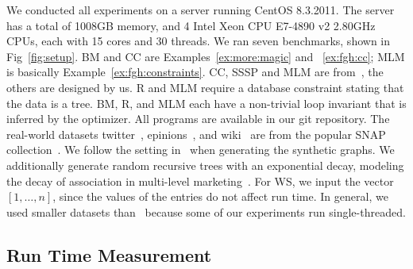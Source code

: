     We conducted all experiments on a server running CentOS 8.3.2011.
    The server has a total of 1008GB memory, and
    4 Intel Xeon CPU E7-4890 v2 2.80GHz CPUs, 
    each with 15 cores and 30 threads. 
    We ran seven
    benchmarks, shown in Fig~\ref{fig:setup}. BM and CC are
    Examples~\ref{ex:more:magic} and ~\ref{ex:fgh:cc}; MLM is basically
    Example~\ref{ex:fgh:constraints}.  CC, SSSP and MLM are
    from~\cite{BigDatalog}, the others are designed by us.  R and MLM
    require a database constraint stating that the data is a tree.  BM,
    R, and MLM each have a non-trivial loop invariant that is inferred by the
    optimizer.  
    All programs are available in our git repository.  The
    real-world datasets twitter~\cite{mcauley2012learning}, epinions~\cite{richardson2003trust}, and
    wiki~\cite{leskovec2010signed} are from the popular SNAP collection~\cite{snapnets}.  We
    follow the setting in~\cite{BigDatalog,DBLP:journals/pvldb/FanZZAKP19}
    when generating the synthetic graphs.
    We additionally generate random recursive trees with an exponential
    decay, modeling the decay of association in multi-level
    marketing~\cite{emek2011mechanisms}.
    For WS, we input the vector
    $[1, \ldots, n]$, since the values of the entries do not affect run time.
    In general, we used smaller datasets
    than~\cite{BigDatalog,DBLP:journals/pvldb/FanZZAKP19} because some of
    our experiments run single-threaded.
    
    
    
    
    
    \subsection{Run Time Measurement}
    
    
